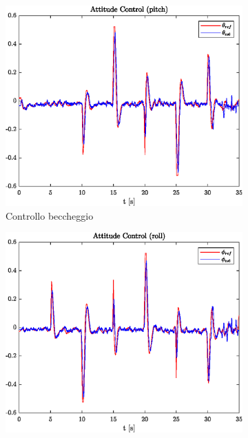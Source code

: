 \begin{figure}
	\centering
	\begin{subfigure}{0.45\textwidth}
		\centering
		\includegraphics[width=1\textwidth]{Simulazioni/Figure/SMC/SQUARE/AttitudeControlPitch}
		\caption{Controllo beccheggio}
	\end{subfigure}
	\hfill
	\begin{subfigure}{0.45\textwidth}
		\centering
		\includegraphics[width=1\textwidth]{Simulazioni/Figure/SMC/SQUARE/AttitudeControlRoll}

\end{subfigure}
\end{figure}
